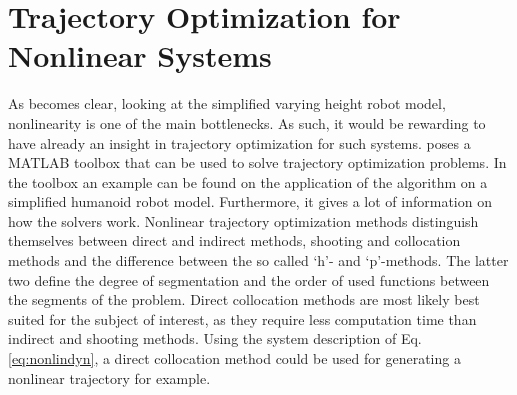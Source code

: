 \section{Trajectory Optimization for Nonlinear Systems}
As becomes clear, looking at the simplified varying height robot model, nonlinearity is one of the main bottlenecks. As such, it would be rewarding to have already an insight in trajectory optimization for such systems. \cite{kelly2017introduction} poses a MATLAB  toolbox that can be used to solve trajectory optimization problems. In the toolbox an example can be found on the application of the algorithm on a simplified humanoid robot model. Furthermore, it gives a lot of information on how the solvers work. Nonlinear trajectory optimization methods distinguish themselves between direct and indirect methods, shooting and collocation methods and the difference between the so called `h'- and `p'-methods. The latter two define the degree of segmentation and the order of used functions between the segments of the problem. Direct collocation methods are most likely best suited for the subject of interest, as they require less computation time than indirect and shooting methods. Using the system description of Eq. \eqref{eq:nonlindyn}, a direct collocation method could be used for generating a nonlinear trajectory for example. 


